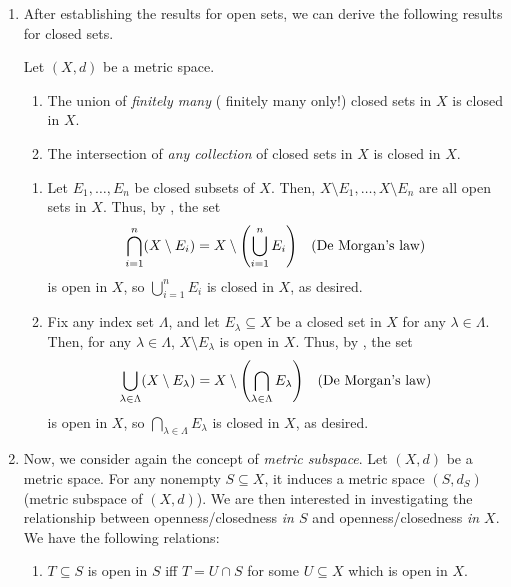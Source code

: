 \begin{enumerate}
\item After establishing the results for open sets, we can derive the following
results for closed sets.
\begin{corollary}
Let \((X,d)\) be a metric space.
\begin{enumerate}
\item \label{it:closed-sets-union-closed}
The union of \emph{finitely many} (\warn{} finitely many only!) closed
sets in \(X\) is closed in \(X\).
\item \label{it:closed-sets-intersect-closed}
The intersection of \emph{any collection} of closed sets in \(X\) is
closed in \(X\).
\end{enumerate}
\end{corollary}
\begin{pf}
\begin{enumerate}
\item Let \(E_1,\dotsc,E_n\) be closed subsets of \(X\).
Then, \(X\setminus E_1,\dotsc,X\setminus E_n\) are all open sets in \(X\).
Thus, by , the set
\[
\bigcap_{i=1}^{n}(X\setminus E_i)=X\setminus\qty(\bigcup_{i=1}^{n}E_i)\quad\text{(De Morgan's law)}
\]
is open in \(X\), so \(\bigcup_{i=1}^{n}E_i\) is closed in \(X\),
as desired.

\item Fix any index set \(\Lambda\), and let \(E_\lambda\subseteq X\) be a
closed set in \(X\) for any \(\lambda\in\Lambda\). Then, for any
\(\lambda\in\Lambda\),  \(X\setminus E_{\lambda}\) is open in \(X\).
Thus, by , the set
\[
\bigcup_{\lambda\in\Lambda}(X\setminus E_{\lambda})=X\setminus\qty(\bigcap_{\lambda\in\Lambda}E_{\lambda})\quad\text{(De Morgan's law)}
\]
is open in \(X\), so \(\bigcap_{\lambda\in\Lambda}E_{\lambda}\) is closed in \(X\),
as desired.
\end{enumerate}
\end{pf}
\item \label{it:open-closed-equiv-crit-metric-subspace} Now, we consider again the concept of \emph{metric subspace}. Let
\((X,d)\) be a metric space. For any nonempty \(S\subseteq X\), it induces a
metric space \((S,d_S)\) (metric subspace of \((X,d)\)). We are then interested
in investigating the relationship between openness/closedness \emph{in \(S\)}
and openness/closedness \emph{in \(X\)}. We have the following relations:
\begin{enumerate}
\item \(T\subseteq S\) is open in \(S\) iff \(T=U\cap S\) for some \(U\subseteq
X\) which is open in \(X\).


\end{enumerate}
\end{enumerate}

